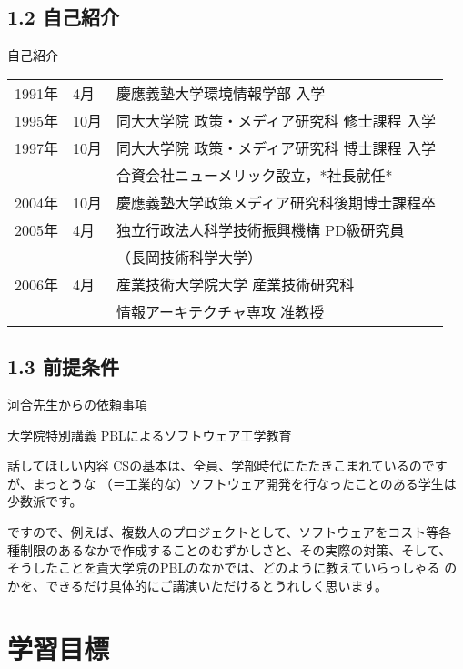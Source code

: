 \documentclass{beamer}
\begin{document}
\subsection{1.2 自己紹介}

\label{sec-1}
\begin{frame}[label=sec-1-1]{自己紹介}
\begin{center}
\begin{tabular}{lll}
1991年 & 4月 & 慶應義塾大学環境情報学部 入学\\
1995年 & \alert{10月} & 同大大学院 政策・メディア研究科 修士課程 入学\\
1997年 & 10月 & 同大大学院 政策・メディア研究科 博士課程 入学\\
 &  & 合資会社ニューメリック設立，*社長就任*\\
2004年 & 10月 & 慶應義塾大学政策メディア研究科後期博士課程卒\\
2005年 & 4月 & 独立行政法人科学技術振興機構 PD級研究員\\
 &  & （長岡技術科学大学）\\
2006年 & 4月 & 産業技術大学院大学 産業技術研究科\\
 &  & 情報アーキテクチャ専攻 准教授\\
\end{tabular}
\end{center}
\end{frame}

\subsection{1.3 前提条件}
\begin{frame}[label=sec-1-2]{河合先生からの依頼事項}
\begin{block}{大学院特別講義}
PBLによるソフトウェア工学教育
\end{block}
\begin{block}{話してほしい内容}
CSの基本は、全員、学部時代にたたきこまれているのですが、まっとうな
（＝工業的な）ソフトウェア開発を行なったことのある学生は少数派です。

ですので、例えば、複数人のプロジェクトとして、ソフトウェアをコスト等各
種制限のあるなかで作成することのむずかしさと、その実際の対策、そして、
そうしたことを貴大学院のPBLのなかでは、どのように教えていらっしゃる
のかを、できるだけ具体的にご講演いただけるとうれしく思います。
\end{block}
\end{frame}

\section{学習目標}
\end{document}
